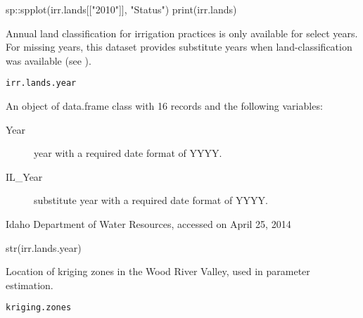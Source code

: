 \documentclass[a4paper]{book}
\begin{document}
%
\begin{Examples}
\begin{ExampleCode}
sp::spplot(irr.lands[["2010"]], "Status")
print(irr.lands)

\end{ExampleCode}
\end{Examples}
%
\begin{Description}\relax
Annual land classification for irrigation practices is only available for select years.
For missing years, this dataset provides substitute years when land-classification was
available (see ).
\end{Description}
%
\begin{Usage}
\begin{verbatim}
irr.lands.year
\end{verbatim}
\end{Usage}
%
\begin{Format}
An object of data.frame class with 16 records and the following variables:
\begin{description}

\item[Year] year with a required date format of YYYY.
\item[IL\_Year] substitute year with a required date format of YYYY.

\end{description}
\end{Format}
%
\begin{Source}\relax
Idaho Department of Water Resources, accessed on April 25, 2014
\end{Source}
%
\begin{Examples}
\begin{ExampleCode}
str(irr.lands.year)

\end{ExampleCode}
\end{Examples}
%
\begin{Description}\relax
Location of kriging zones in the Wood River Valley, used in parameter estimation.
\end{Description}
%
\begin{Usage}
\begin{verbatim}
kriging.zones
\end{verbatim}
\end{Usage}
\end{document}
